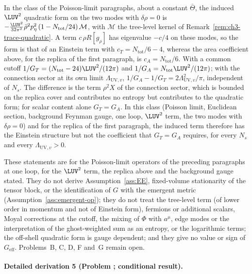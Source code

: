 In the class of the Poisson-limit paragraphs, about a constant \(\bar\Theta\), the induced \(\LUV^2\) quadratic form on the two modes with \(\delta\rho=0\) is \(-\tfrac{\LUV^2}{32\pi^2}\bar\rho^{2}p_\eta^2\,(1-N_{\mathrm{tot}}/24)\,\mathcal M\), with \(\mathcal M\) the tree-level kernel of Remark~\ref{rem:ch3-trace-quadratic}. A term \(c\,\rho R[g_\rho]\) has eigenvalue \(-c/4\) on these modes, so the form is that of an Einstein term with \(c_T=N_{\mathrm{tot}}/6-4\), whereas the area coefficient above, for the replica of the first paragraph, is \(c_A=N_{\mathrm{tot}}/6\). With a common cutoff \(1/G_T=(N_{\mathrm{tot}}-24)\LUV^2/(12\pi)\) and \(1/G_A=N_{\mathrm{tot}}\LUV^2/(12\pi)\); with the connection sector at its own limit \(\Lambda_{\mathrm{UV},v}\), \(1/G_A-1/G_T=2\Lambda_{\mathrm{UV},v}^2/\pi\), independent of \(N_s\). The difference is the term \(\rho^2X\) of the connection sector, which is bounded on the replica cover and contributes no entropy but contributes to the quadratic form; for scalar content alone \(G_T=G_A\). In this class (Poisson limit, Euclidean section, background Feynman gauge, one loop, \(\LUV^2\) term, the two modes with \(\delta\rho=0\)) and for the replica of the first paragraph, the induced term therefore has the Einstein structure but not the coefficient that \(G_T=G_A\) requires, for every \(N_s\) and every \(\Lambda_{\mathrm{UV},v}>0\).



These statements are for the Poisson-limit operators of the preceding paragraphs at one loop, for the \(\LUV^2\) term, the replica above and the background gauge stated. They do not derive Assumption~\ref{ass:EE}, fixed-volume stationarity of the tensor block, or the identification of \(G\) with the emergent metric (Assumption~\ref{ass:emergent-op}); they do not treat the tree-level term (of lower order in momentum and not of Einstein form), fermions or additional scalars, Moyal corrections at the cutoff, the mixing of \(\Phi\) with \(a^\mu\), edge modes or the interpretation of the ghost-weighted sum as an entropy, or the logarithmic terms; the off-shell quadratic form is gauge dependent; and they give no value or sign of \(G_{\mathrm{eff}}\). Problems~B, C, D, F and~G remain open.



\paragraph{Detailed derivation 5 (Problem ; conditional result).} \label{ref:detail-4} %



